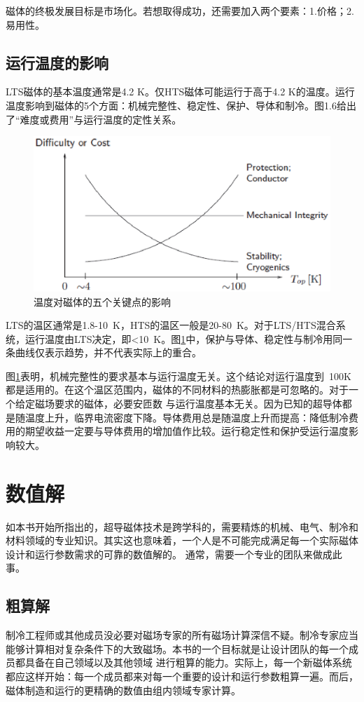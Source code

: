 磁体的终极发展目标是市场化。若想取得成功，还需要加入两个要素：1.价格；2.易用性。

\subsection{运行温度的影响}
LTS磁体的基本温度通常是4.2 K。仅HTS磁体可能运行于高于4.2 K的温度。运行温度影响到磁体的5个方面：机械完整性、稳定性、保护、导体和制冷。图1.6给出了“难度或费用”与运行温度的定性关系。
\begin{figure}
  \centering
 \includegraphics[scale=0.6]{chpt1/figs/fig1.6.eps}
  \caption{
温度对磁体的五个关键点的影响
}\label{temperatureeffect}
\end{figure}
LTS的温区通常是1.8-10\ K，HTS的温区一般是20-80\ K。对于LTS/HTS混合系统，运行温度由LTS决定，即<10\ K。图\ref{temperatureeffect}中，保护与导体、稳定性与制冷用同一条曲线仅表示趋势，并不代表实际上的重合。

图\ref{temperatureeffect}表明，机械完整性的要求基本与运行温度无关。这个结论对运行温度到~100K都是适用的。在这个温区范围内，磁体的不同材料的热膨胀都是可忽略的。对于一个给定磁场要求的磁体，必要安匝数
与运行温度基本无关。因为已知的超导体都是随温度上升，临界电流密度下降。导体费用总是随温度上升而提高：降低制冷费用的期望收益一定要与导体费用的增加值作比较。运行稳定性和保护受运行温度影响较大。

\section{数值解}
如本书开始所指出的，超导磁体技术是跨学科的，需要精炼的机械、电气、制冷和材料领域的专业知识。其实这也意味着，一个人是不可能完成满足每一个实际磁体设计和运行参数需求的可靠的数值解的。
通常，需要一个专业的团队来做成此事。
\subsection{粗算解}
制冷工程师或其他成员没必要对磁场专家的所有磁场计算深信不疑。制冷专家应当能够计算相对复杂条件下的大致磁场。本书的一个目标就是让设计团队的每一个成员都具备在自己领域以及其他领域
进行粗算的能力。实际上，每一个新磁体系统都应这样开始：每一个成员都来对每一个重要的设计和运行参数粗算一遍。而后，磁体制造和运行的更精确的数值由组内领域专家计算。

